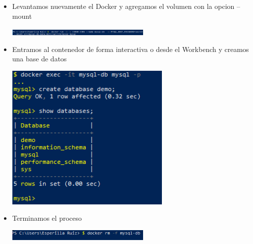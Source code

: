 \documentclass[%
 reprint,
 amsmath,amssymb,
 aps,
]{revtex4-1}
\begin{document}
\begin{itemize}
\begin{center}
		\end{center}
                     \item Levantamos nuevamente el Docker y agregamos el volumen con la opcion --mount
                     \begin{center}
		\includegraphics[width=7cm]{./Imagenes/22}
		\end{center}
                     \item Entramos al contenedor de forma interactiva o desde el Workbench y creamos una base de datos
                     \begin{center}
		\includegraphics[width=8cm]{./Imagenes/23}
		\end{center}	
                      \item  Terminamos el proceso 
                     \begin{center}
		\includegraphics[width=7cm]{./Imagenes/24}
		\end{center}	                  
	          \end{itemize}
\end{document}
